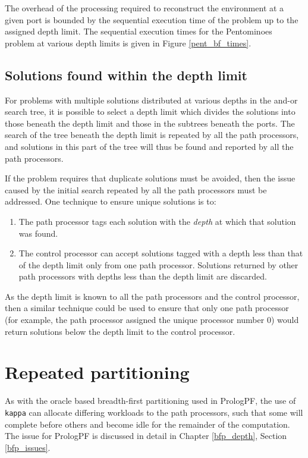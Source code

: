 The overhead of the processing required to reconstruct the environment at a given
port is bounded by the sequential execution time of the problem up to the
assigned depth limit.  The sequential execution times for the Pentominoes problem
at various depth limits is given in Figure \ref{pent_bf_times}.

\subsection{Solutions found within the depth limit}

For problems with multiple solutions distributed at various depths in the
and-or search tree, it is possible to select a depth limit which divides
the solutions into those beneath the depth limit and those in the subtrees
beneath the ports.  The search of the tree beneath the depth limit is repeated by
all the path processors, and solutions in this part of the tree will thus be found
and reported by all the path processors.

If the problem requires that duplicate solutions must be avoided, then the issue
caused by the initial search repeated by all the path processors must be addressed.
One technique to ensure unique solutions is to:
\begin{enumerate}
\item{The path processor tags each solution with the
  \textit{depth} at which that solution was found.}
\item{The control processor can accept solutions tagged with a depth less than
  that of the depth limit only from one path processor.  Solutions returned by
  other path processors with depths less than the depth limit are discarded.}
\end{enumerate}
As the depth limit is known to all the path processors and the control processor,
then a similar technique could be used to ensure that only one path processor
(for example, the path processor assigned the unique processor number 0) would return
solutions below the depth limit to the control processor.

\section{Repeated partitioning} %

As with the oracle based breadth-first partitioning used in PrologPF, the use
of \texttt{kappa} can allocate differing workloads to the path processors, such that
some will complete before others and become idle for the remainder of the
computation.  The issue for PrologPF is discussed in detail in Chapter \ref{bfp_depth},
Section \ref{bfp_issues}.

